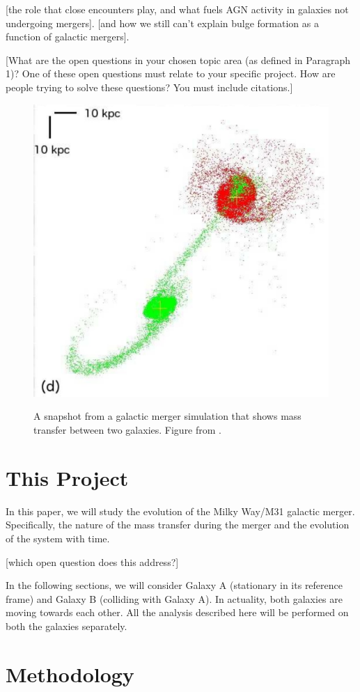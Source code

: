 \documentclass[linenumbers]{aastex631} %
\begin{document}
\citep{Silverman_2011} [the role that close encounters play, and what fuels AGN activity in galaxies not undergoing mergers]. [and how we still can't explain bulge formation as a function of galactic mergers]\citep{Brooks2016}.

[What are the open questions in your chosen topic area (as defined in
Paragraph 1)? One of these open questions must relate to your specific project. How
are people trying to solve these questions? You must include citations.]

\begin{figure}
    \centering
    \includegraphics[width = 0.5\linewidth]{page08_1.jpg}
    \label{fig:Privon image}
    \caption{A snapshot from a galactic merger simulation that shows mass transfer between two galaxies. Figure from \citep{Privon_2013}.}
\end{figure}


\section{This Project}

In this paper, we will study the evolution of the Milky Way/M31 galactic merger. Specifically, the nature of the mass transfer during the merger and the evolution of the system with time. 

[which open question does this address?]

In the following sections, we will consider Galaxy A (stationary in its reference frame) and Galaxy B (colliding with Galaxy A). In actuality, both galaxies are moving towards each other. All the analysis described here will be performed on both the galaxies separately.

\section{Methodology}
\end{document}
